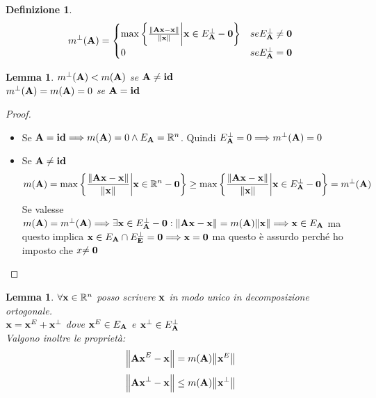 \documentclass[10pt,a4paper]{article}
\newtheorem{definition}{Definizione}[section]
\newtheorem{lemma}[theorem]{Lemma}
\begin{document}
\begin{definition}

\[ m^{\perp}(\vb{A}) = \begin{cases} 
      \max \bigg\{ \frac{\norm{\vb{Ax-x}}}{\norm{\vb{x}}} \bigg|  \vb{x} \in E^{\perp}_{\vb{A}} - \vb{0} \bigg\}  &  se   E^{\perp}_{\vb{A}} \neq {\vb{0}} \\
      0 & se   E^{\perp}_{\vb{A}} = {\vb{0}} \\
      
   \end{cases}
\]

\end{definition}

\begin{lemma}
$m^{\perp}(\vb{A}) < m(\vb{A})$ se $\vb{A \neq id} $\\
$m^{\perp}(\vb{A}) = m(\vb{A}) = 0$ se $\vb{A = id}$

\end{lemma}

\begin{proof}
\begin{itemize}
\item Se $\vb{A = id} \Longrightarrow m(\vb{A}) = 0 \land E_{\vb{A}} = \mathbb{R}^n$. Quindi $E^{\perp}_{\vb{A}} = {0} \Longrightarrow m^{\perp}(\vb{A}) = 0$

\item Se $\vb{A \neq id}$ \\
\[ m(\vb{A}) = \max \bigg\{ \frac{\norm{\vb{Ax-x}}}{\norm{\vb{x}}} \bigg|  \vb{x} \in \mathbb{R}^{n}-\vb{0} \bigg\} 
\geq \max \bigg\{ \frac{\norm{\vb{Ax-x}}}{\norm{\vb{x}}} \bigg|  \vb{x} \in E^{\perp}_{\vb{A}} - \vb{0} \bigg\} =  m^{\perp}(\vb{A}) \]
Se valesse $m(\vb{A}) = m^{\perp}(\vb{A}) \Longrightarrow \exists \vb{x} \in E^{\perp}_{\vb{A}} - \vb{0} : \norm{\vb{Ax-x}} = m(\vb{A})\norm{\vb{x}} \Longrightarrow \vb{x} \in E_{\vb{A}}$  ma questo implica $\vb{x} \in E_{\vb{A}} \cap E^{\perp}_{\vb{E}} = {\vb{0}} \Longrightarrow \vb{x = 0} $  ma questo è assurdo perché ho imposto che $x\vb{ \neq 0}$ 
\end{itemize}
\end{proof}

\begin{lemma}
$\forall \vb{x} \in \mathbb{R}^n $ posso scrivere $\vb{x}$ in modo unico in decomposizione ortogonale. \\
$\vb{x} = \vb{x}^E + \vb{x}^{\perp}$ dove $\vb{x}^E \in E_{\vb{A}}$ e $\vb{x}^{\perp} \in E^{\perp}_{\vb{A}}$ \\
Valgono inoltre le proprietà:
\[ \norm{\vb{Ax}^E - \vb{x} }= m(\vb{A})\norm{\vb{x}^E} \] \[\norm{\vb{Ax}^{\perp} - \vb{x}} \leq m(\vb{A}) \norm{\vb{x}^{\perp}} \]
\end{lemma}
\end{document}
